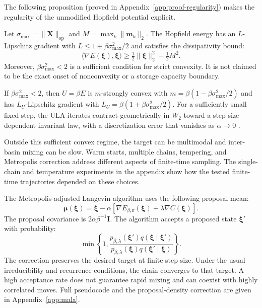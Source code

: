 The following proposition (proved in
Appendix~\ref{app:proof-regularity}) makes the regularity of the unmodified
Hopfield potential explicit.

\begin{proposition}
\label{prop:regularity}
Let $\sigma_{\max}=\lVert\mathbf X\rVert_{\mathrm{op}}$ and
$M=\max_k\lVert\mathbf m_k\rVert_2$. The Hopfield energy has an
$L$-Lipschitz gradient with
$L\leq 1+\beta\sigma_{\max}^2/2$ and satisfies the dissipativity bound:
\begin{equation}
\langle\nabla E(\boldsymbol\xi),\boldsymbol\xi\rangle
\geq \tfrac12\lVert\boldsymbol\xi\rVert_2^2-\tfrac12M^2.
\end{equation}
Moreover, $\beta\sigma_{\max}^2<2$ is a sufficient condition for strict
convexity. It is not claimed to be the exact onset of nonconvexity or a storage
capacity boundary.
\end{proposition}

\begin{corollary}
\label{cor:convergence}
If $\beta\sigma_{\max}^2<2$, then $U=\beta E$ is
$m$-strongly convex with
$m=\beta(1-\beta\sigma_{\max}^2/2)$ and has
$L_U$-Lipschitz gradient with
$L_U=\beta(1+\beta\sigma_{\max}^2/2)$. For a sufficiently small fixed step,
the ULA iterates contract geometrically in $W_2$ toward a step-size-dependent invariant
law, with a discretization error that vanishes as $\alpha\rightarrow0$
\cite{dalalyanTheoreticalGuaranteesApproximate2017,durmusNonasymptoticAnalysisUnadjusted2017}.
\end{corollary}

Outside this sufficient convex regime, the target can be multimodal and
inter-basin mixing can be slow. Warm starts, multiple chains, tempering, and
Metropolis correction address different aspects of finite-time sampling. The
single-chain and temperature experiments in the appendix show how the tested
finite-time trajectories depended on these choices.

The Metropolis-adjusted Langevin algorithm uses the following proposal mean:
\begin{equation}
\boldsymbol\mu(\boldsymbol\xi)
=\boldsymbol\xi-\alpha\left[
\nabla E_{\beta,\mathbf r}(\boldsymbol\xi)
+\lambda\nabla C(\boldsymbol\xi)\right].
\end{equation}
The proposal covariance is $2\alpha\beta^{-1}\mathbf I$. The algorithm accepts
a proposed state $\boldsymbol\xi'$ with probability:
\begin{equation}
\min\!\left\{1,
\frac{p_{\beta,\lambda}(\boldsymbol\xi')
q(\boldsymbol\xi\mid\boldsymbol\xi')}
{p_{\beta,\lambda}(\boldsymbol\xi)
q(\boldsymbol\xi'\mid\boldsymbol\xi)}\right\}.
\label{eq:mala-acceptance}
\end{equation}
The correction preserves the desired target at finite step size. Under the
usual irreducibility and recurrence conditions, the chain converges to that
target. A high acceptance rate does not guarantee rapid mixing and can coexist
with highly correlated moves. Full pseudocode and the proposal-density
correction are given in Appendix~\ref{app:mala}.

